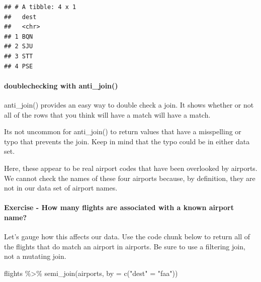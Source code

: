\documentclass[
]{article}
\newenvironment{Shaded}{\begin{snugshade}}{\end{snugshade}}
\newcommand{\AttributeTok}[1]{\textcolor[rgb]{0.77,0.63,0.00}{#1}}
\newcommand{\FunctionTok}[1]{\textcolor[rgb]{0.00,0.00,0.00}{#1}}
\newcommand{\NormalTok}[1]{#1}
\newcommand{\OtherTok}[1]{\textcolor[rgb]{0.56,0.35,0.01}{#1}}
\newcommand{\SpecialCharTok}[1]{\textcolor[rgb]{0.00,0.00,0.00}{#1}}
\newcommand{\StringTok}[1]{\textcolor[rgb]{0.31,0.60,0.02}{#1}}
\begin{document}
\begin{verbatim}
## # A tibble: 4 x 1
##   dest 
##   <chr>
## 1 BQN  
## 2 SJU  
## 3 STT  
## 4 PSE
\end{verbatim}

\hypertarget{doublechecking-with-anti_join}{%
\paragraph{doublechecking with
anti\_join()}\label{doublechecking-with-anti_join}}

anti\_join() provides an easy way to double check a join. It shows
whether or not all of the rows that you think will have a match will
have a match.

Its not uncommon for anti\_join() to return values that have a
misspelling or typo that prevents the join. Keep in mind that the typo
could be in either data set.

Here, these appear to be real airport codes that have been overlooked by
airports. We cannot check the names of these four airports because, by
definition, they are not in our data set of airport names.

\hypertarget{exercise---how-many-flights-are-associated-with-a-known-airport-name}{%
\paragraph{Exercise - How many flights are associated with a known
airport
name?}\label{exercise---how-many-flights-are-associated-with-a-known-airport-name}}

Let's gauge how this affects our data. Use the code chunk below to
return all of the flights that do match an airport in airports. Be sure
to use a filtering join, not a mutating join.

\begin{Shaded}
\begin{Highlighting}[]
\NormalTok{flights }\SpecialCharTok{\%\textgreater{}\%}
  \FunctionTok{semi\_join}\NormalTok{(airports, }\AttributeTok{by =} \FunctionTok{c}\NormalTok{(}\StringTok{"dest"} \OtherTok{=} \StringTok{"faa"}\NormalTok{))}
\end{Highlighting}
\end{Shaded}
\end{document}
